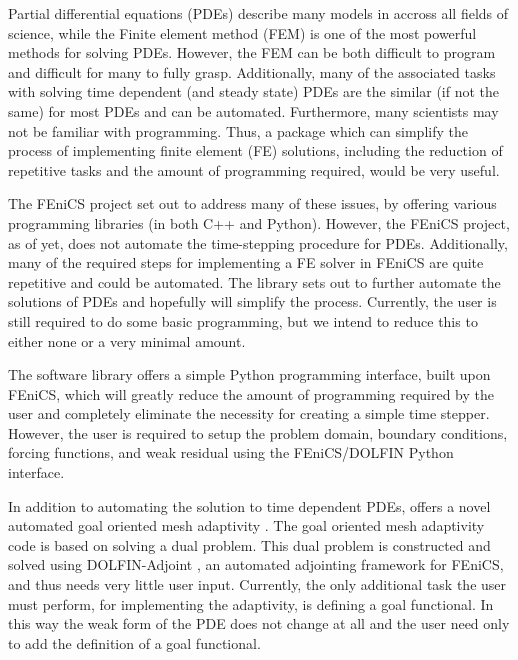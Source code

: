 Partial differential equations (PDEs) describe many models in accross all fields
of science, while the Finite element method (FEM) is one of the most powerful
methods for solving PDEs. However, the FEM can be both difficult to program and
difficult for many to fully grasp. Additionally, many of the associated tasks
with solving time dependent (and steady state) PDEs are the similar (if not the
same) for most PDEs and can be automated. Furthermore, many scientists may not
be familiar with programming. Thus, a package which can simplify the process of
implementing finite element (FE) solutions, including the reduction of
repetitive tasks and the amount of programming required, would be very useful.

The FEniCS project\cite{Alnae2011} set out to address many of these issues, by
offering various programming libraries (in both C++ and Python). However, the
FEniCS project, as of yet, does not automate the time-stepping procedure for
PDEs. Additionally, many of the required steps for implementing a FE solver in
FEniCS are quite repetitive and could be automated. The \ASP library sets out to
further automate the solutions of PDEs and hopefully will simplify the process.
Currently, the user is still required to do some basic programming, but we
intend to reduce this to either none or a very minimal amount.

The \ASP software library offers a simple Python programming interface, built
upon FEniCS, which will greatly reduce the amount of programming required by the
user and completely eliminate the necessity for creating a simple time stepper.
However, the user is required to setup the problem domain, boundary conditions,
forcing functions, and weak residual using the FEniCS/DOLFIN Python interface.

In addition to automating the solution to time dependent PDEs, \ASP offers a
novel automated goal oriented mesh adaptivity \cite{Foster2014e, Jansson2014a,
Jansson2014b}.  The goal oriented mesh adaptivity code is based on solving a
dual problem.  This dual problem is constructed and solved using DOLFIN-Adjoint
\cite{Ham2012, Ferrell2014}, an automated adjointing framework for FEniCS, and
thus needs very little user input.  Currently, the only additional task the user
must perform, for implementing the adaptivity, is defining a goal functional.
In this way the weak form of the PDE does not change at all and the user need
only to add the definition of a goal functional.
